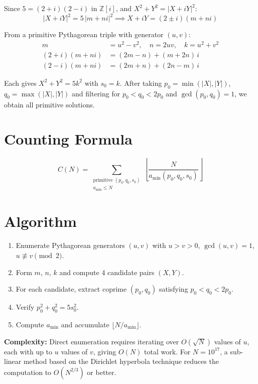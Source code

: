 \documentclass[11pt,a4paper]{article}
\begin{document}
Since $5 = (2+i)(2-i)$ in $\mathbb{Z}[i]$, and $X^2 + Y^2 = |X + iY|^2$:
\[
  |X + iY|^2 = 5\,|m + ni|^2 \implies X + iY = (2 \pm i)(m + ni)
\]

From a primitive Pythagorean triple with generator $(u, v)$:
\begin{align*}
  m &= u^2 - v^2, \quad n = 2uv, \quad k = u^2 + v^2 \\
  (2+i)(m+ni) &= (2m - n) + (m + 2n)\,i \\
  (2-i)(m+ni) &= (2m + n) + (2n - m)\,i
\end{align*}

Each gives $X^2 + Y^2 = 5k^2$ with $s_0 = k$. After taking $p_0 = \min(|X|,|Y|)$,
$q_0 = \max(|X|,|Y|)$ and filtering for $p_0 < q_0 < 2p_0$ and $\gcd(p_0,q_0) = 1$,
we obtain all primitive solutions.

\section{Counting Formula}

\begin{equation}
  C(N) = \sum_{\substack{\text{primitive } (p_0, q_0, s_0) \\ a_{\min} \leq N}}
    \left\lfloor \frac{N}{a_{\min}(p_0, q_0, s_0)} \right\rfloor
\end{equation}

\section{Algorithm}

\begin{enumerate}[label=\arabic*.]
  \item Enumerate Pythagorean generators $(u, v)$ with $u > v > 0$, $\gcd(u,v) = 1$,
    $u \not\equiv v \pmod{2}$.
  \item Form $m$, $n$, $k$ and compute 4 candidate pairs $(X, Y)$.
  \item For each candidate, extract coprime $(p_0, q_0)$ satisfying $p_0 < q_0 < 2p_0$.
  \item Verify $p_0^2 + q_0^2 = 5s_0^2$.
  \item Compute $a_{\min}$ and accumulate $\lfloor N/a_{\min} \rfloor$.
\end{enumerate}

\noindent\textbf{Complexity:} Direct enumeration requires iterating over $O(\sqrt{N})$
values of $u$, each with up to $u$ values of $v$, giving $O(N)$ total work.
For $N = 10^{17}$, a sub-linear method based on the Dirichlet hyperbola technique
reduces the computation to $O(N^{2/3})$ or better.
\end{document}
